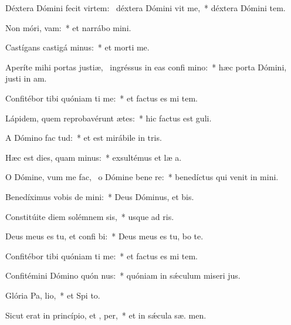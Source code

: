 \item Déxtera Dómini fecit virtem:~\pscross{} déxtera Dómini vit me,~* déxtera Dómini  tem.
\item Non móri,  vam:~* et narrábo  mini.
\item Castígans castigá  minus:~* et morti   me.
\item Aperíte mihi portas justiæ,~\pscross{} ingréssus in eas confi mino:~* hæc porta Dómini, justi in  am.
\item Confitébor tibi quóniam ti me:~* et factus es mi  tem.
\item Lápidem, quem reprobavérunt ætes:~* hic factus est   guli.
\item A Dómino fac  tud:~* et est mirábile in  tris.
\item Hæc est dies, quam  minus:~* exsultémus et læ  a.
\item O Dómine, vum me fac,~\pscross{} o Dómine bene re:~* benedíctus qui venit in  mini.
\item Benedíximus vobis de  mini:~* Deus Dóminus, et  bis.
\item Constitúite diem solémnem  sis,~* usque ad  ris.
\item Deus meus es tu, et confi bi:~* Deus meus es tu,  bo te.
\item Confitébor tibi quóniam ti me:~* et factus es mi  tem.
\item Confitémini Dómino quón nus:~* quóniam in sǽculum miseri jus.
\item Glória Pa,  lio,~* et Spi to.
\item Sicut erat in princípio, et ,  per,~* et in sǽcula sæ. men.
